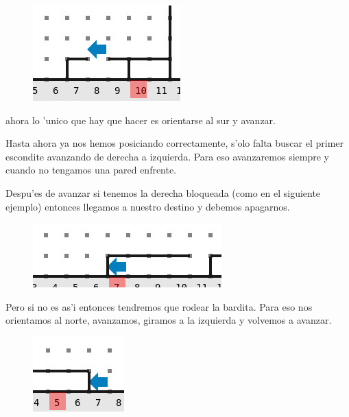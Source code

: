 \documentclass{article}
\begin{document}
\begin{enumerate}
            \begin{figure}[H]
                \centering
                \includegraphics[scale=0.5]{ultima_bloqueada_izquierda_libre}
            \end{figure}

            ahora lo 'unico que hay que hacer es orientarse al sur y avanzar.
    \end{enumerate}

    Hasta ahora ya nos hemos posiciando correctamente, s'olo falta buscar el primer escondite avanzando de
    derecha a izquierda. Para eso avanzaremos siempre y cuando no tengamos una pared enfrente.

    \hfill \break
    \hfill \break

    Despu'es de avanzar si tenemos la derecha bloqueada (como en el siguiente ejemplo)
    entonces llegamos a nuestro destino y debemos apagarnos.

    \begin{figure}[H]
        \centering
        \includegraphics[scale=0.5]{escondite_bueno}
    \end{figure}

    Pero si no es as'i entonces tendremos que rodear la bardita. Para eso nos orientamos al norte, avanzamos,
    giramos a la izquierda y volvemos a avanzar.

    \begin{figure}[h]
        \centering
        \includegraphics[scale=0.5]{primera_parte_saltar_barda}
    \end{figure}
\end{document}
